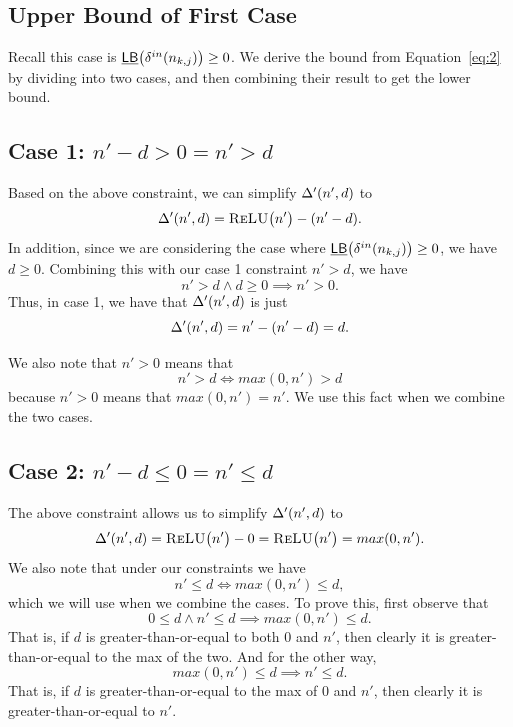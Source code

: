 \subsection{Upper Bound of First Case}
Recall this case is $ \underline{\mathsf{LB}}\big(\delta^{in}(n_{k,j})\big) \geq 0 $.
We derive the bound from Equation~\ref{eq:2} by dividing into two cases, and then combining their result
to get the lower bound.

\subsection*{Case 1: $ n' - d > 0 = n' > d $}
Based on the above constraint, we can simplify $ \Delta'(n',d) $ to
\[
	\Delta'(n',d) = \textsc{ReLU}\big(n'\big) - (n' - d).
\]
In addition, since we are considering the case where $ \underline{\mathsf{LB}}\big(\delta^{in}(n_{k,j})\big) \geq 0 $,
we have $ d \geq 0 $. Combining this with our case 1 constraint $ n' > d $,
we have
\[
	n' > d \wedge d \geq 0 \implies n' > 0.
\]
Thus, in case 1, we have that $ \Delta'(n',d) $ is just
\[
	\Delta'(n',d) = n' - (n' - d) = d.
\]

We also note that $ n' > 0 $ means that
\[
n' > d \iff max(0, n') > d
\]
because $ n' > 0 $ means that $ max(0, n') = n' $. We use this fact when we combine the two cases.

\subsection*{Case 2: $ n' - d \leq 0 = n' \leq d $}
The above constraint allows us to simplify $ \Delta'(n',d) $ to
\[
	\Delta'(n',d) = \textsc{ReLU}\big(n'\big) - 0 = \textsc{ReLU}\big(n'\big) = max(0, n').
\]
We also note that under our constraints we have
\[
n' \leq d \iff max(0, n') \leq d,
\]
which we will use when we combine the cases. To prove this, first observe that
\[
0 \leq d \wedge n' \leq d \implies max(0, n') \leq d.
\]
That is, if $ d $ is greater-than-or-equal to both 0 and $ n' $, then clearly
it is greater-than-or-equal to the max of the two. And for the other way,
\[
max(0, n') \leq d \implies  n' \leq d.
\]
That is, if $ d $ is greater-than-or-equal to the max of 0 and $ n' $, then clearly
it is greater-than-or-equal to $ n' $.

